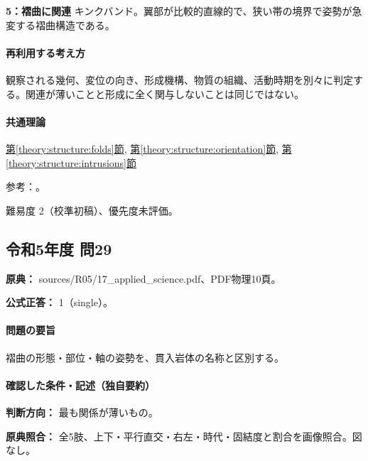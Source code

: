 \noindent\textbf{5：褶曲に関連} キンクバンド。翼部が比較的直線的で、狭い帯の境界で姿勢が急変する褶曲構造である。\par

\paragraph{再利用する考え方} 観察される幾何、変位の向き、形成機構、物質の組織、活動時期を別々に判定する。関連が薄いことと形成に全く関与しないことは同じではない。

\paragraph{共通理論} \hyperref[theory:structure:folds]{第\ref*{theory:structure:folds}節}, \hyperref[theory:structure:orientation]{第\ref*{theory:structure:orientation}節}, \hyperref[theory:structure:intrusions]{第\ref*{theory:structure:intrusions}節}

\par 参考：\cite{str_intrusion,str_fold}。

\par 難易度 2（校準初稿）、優先度未評価。

\subsection{令和5年度 問29}
\label{q:r05-reg-applied-29}

\noindent\textbf{原典：} sources/R05/17\_applied\_science.pdf、PDF物理10頁。

\textbf{公式正答：} 1（single）。

\paragraph{問題の要旨} 褶曲の形態・部位・軸の姿勢を、貫入岩体の名称と区別する。

\paragraph{確認した条件・記述（独自要約）}\mbox{}\par

\noindent\textbf{判断方向：} 最も関係が薄いもの。\par

\noindent\textbf{原典照合：} 全5肢、上下・平行直交・右左・時代・固結度と割合を画像照合。図なし。\par

